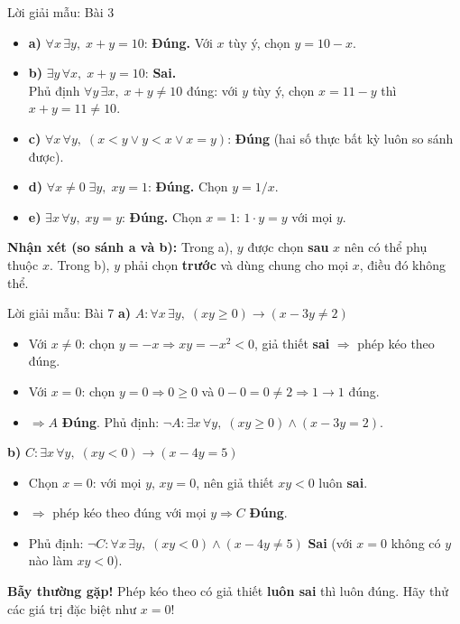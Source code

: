 \documentclass[12pt,a4paper]{article}
\begin{document}
\begin{baitap}{Lời giải mẫu: Bài 3}
\begin{itemize}
  \item \textbf{a)} $\forall x\,\exists y,\; x + y = 10$: \textcolor{AccentGreen}{\textbf{Đúng.}} Với $x$ tùy ý, chọn $y = 10 - x$.
  \item \textbf{b)} $\exists y\,\forall x,\; x + y = 10$: \textcolor{AccentRed}{\textbf{Sai.}}\\
  Phủ định $\forall y\,\exists x,\; x + y \neq 10$ đúng: với $y$ tùy ý, chọn $x = 11 - y$ thì $x + y = 11 \neq 10$.
  \item \textbf{c)} $\forall x\,\forall y,\; (x < y \lor y < x \lor x = y)$: \textcolor{AccentGreen}{\textbf{Đúng}} (hai số thực bất kỳ luôn so sánh được).
  \item \textbf{d)} $\forall x \neq 0\;\exists y,\; xy = 1$: \textcolor{AccentGreen}{\textbf{Đúng.}} Chọn $y = 1/x$.
  \item \textbf{e)} $\exists x\,\forall y,\; xy = y$: \textcolor{AccentGreen}{\textbf{Đúng.}} Chọn $x = 1$: $1 \cdot y = y$ với mọi $y$.
\end{itemize}

\textbf{\textcolor{PrimaryBlue}{Nhận xét (so sánh a và b):}} Trong a), $y$ được chọn \textbf{sau} $x$ nên có thể phụ thuộc $x$. Trong b), $y$ phải chọn \textbf{trước} và dùng chung cho mọi $x$, điều đó không thể.
\end{baitap}

\begin{baitap}{Lời giải mẫu: Bài 7}
\textbf{a)} $A : \forall x\,\exists y,\; (xy \ge 0) \to (x - 3y \neq 2)$
\begin{itemize}
  \item Với $x \neq 0$: chọn $y = -x \Rightarrow xy = -x^2 < 0$, giả thiết \textbf{sai} $\Rightarrow$ phép kéo theo đúng.
  \item Với $x = 0$: chọn $y = 0 \Rightarrow 0 \ge 0$ và $0 - 0 = 0 \neq 2 \Rightarrow 1 \to 1$ đúng.
  \item $\Rightarrow A$ \textbf{Đúng}. Phủ định: $\neg A : \exists x\,\forall y,\; (xy \ge 0) \land (x - 3y = 2)$.
\end{itemize}

\textbf{b)} $C : \exists x\,\forall y,\; (xy < 0) \to (x - 4y = 5)$
\begin{itemize}
  \item Chọn $x = 0$: với mọi $y$, $xy = 0$, nên giả thiết $xy < 0$ luôn \textbf{sai}.
  \item $\Rightarrow$ phép kéo theo đúng với mọi $y \Rightarrow C$ \textbf{Đúng}.
  \item Phủ định: $\neg C : \forall x\,\exists y,\; (xy < 0) \land (x - 4y \neq 5)$ \textcolor{AccentRed}{\textbf{Sai}} (với $x = 0$ không có $y$ nào làm $xy < 0$).
\end{itemize}

\textbf{\textcolor{AccentRed}{Bẫy thường gặp!}} Phép kéo theo có giả thiết \textbf{luôn sai} thì luôn đúng. Hãy thử các giá trị đặc biệt như $x = 0$!
\end{baitap}
\end{document}
